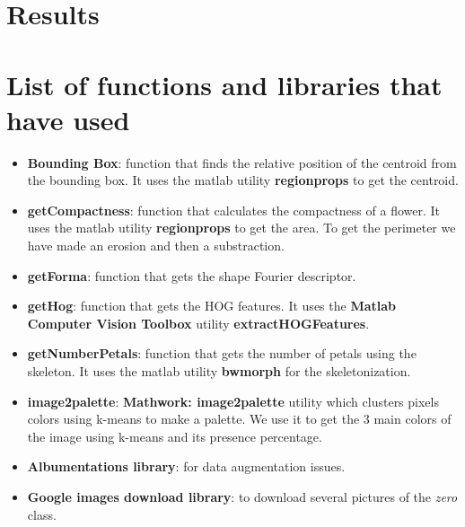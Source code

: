 \documentclass[11]{article}
\begin{document}
\section{Results}




\section{List of functions and libraries that have used}
\begin{itemize}
\item \textbf{Bounding Box}: function that finds the relative position of the centroid from the bounding box. It uses the matlab utility \textbf{regionprops} to get the centroid.
\item \textbf{getCompactness}: function that calculates the compactness of a flower. It uses the matlab utility \textbf{regionprops} to get the area. To get the perimeter we have made an erosion and then a substraction. 
\item \textbf{getForma}: function that gets the shape Fourier descriptor. 
\item \textbf{getHog}: function that gets the HOG features. It uses the \textbf{Matlab Computer Vision Toolbox} utility \textbf{extractHOGFeatures}.
\item \textbf{getNumberPetals}: function that gets the number of petals using the skeleton. It uses the matlab utility \textbf{bwmorph} for the skeletonization. 
\item \textbf{image2palette}: \textbf{Mathwork: image2palette} utility which clusters pixels colors using k-means to make a palette. We use it to get the 3 main colors of the image using k-means and its presence percentage.
\item \textbf{Albumentations library}: for data augmentation issues.
\item \textbf{Google images download library}: to download several pictures of the \textit{zero} class.
\end{itemize}
\end{document}
